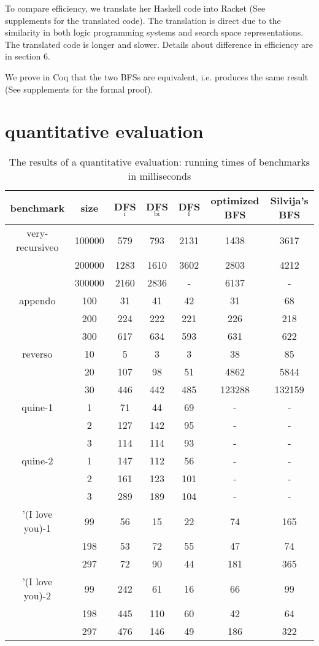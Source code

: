 \documentclass[format=acmlarge, review=true, authordraft=true]{acmart}
\begin{document}
To compare efficiency, we translate her Haskell code into Racket (See 
supplements for the translated code). The translation is direct 
due to the similarity in both logic programming systems and search space 
representations. The translated code is longer and slower. Details about 
difference in efficiency are in section 6.

We prove in Coq that the two BFSs are equivalent, i.e.  
produces the same result (See supplements for the formal proof).

\section{quantitative evaluation}

\begin{table}
	\begin{tabular}{|c|c|c|c|c|c|c|}
		\hline 
		benchmark & size & DFS$_\textrm{i}$ & DFS$_\textrm{bi}$ & DFS$_\textrm{f}$ & optimized BFS & Silvija's BFS  
		\\
		\hline
		very-recursiveo & 100000 &  579 &  793 & 2131 & 1438 & 3617 \\
		& 200000 & 1283 & 1610 & 3602 & 2803 & 4212 \\
		& 300000 & 2160 & 2836 &    - & 6137 &    - \\
		\hline 
		appendo  & 100 &  31 &  41 &  42 &  31 &  68 \\ 
		& 200 & 224 & 222 & 221 & 226 & 218 \\ 
		& 300 & 617 & 634 & 593 & 631 & 622 \\ 
		\hline 
		reverso & 10 &   5 &   3 &   3 &     38 &     85 \\ 
		& 20 & 107 &  98 &  51 &   4862 &   5844 \\
		& 30 & 446 & 442 & 485 & 123288 & 132159 \\ 
		\hline
		quine-1 & 1 &  71 &  44 & 69 & - & - \\ 
		& 2 & 127 & 142 & 95 & - & - \\ 
		& 3 & 114 & 114 & 93 & - & - \\ 
		\hline
		quine-2 & 1 & 147 & 112 &  56 & - & - \\ 
		& 2 & 161 & 123 & 101 & - & - \\ 
		& 3 & 289 & 189 & 104 & - & - \\ 
		\hline 
		'(I love you)-1 &  99 & 56 & 15 & 22 &  74 & 165 \\ 
		& 198 & 53 & 72 & 55 &  47 &  74 \\
		& 297 & 72 & 90 & 44 & 181 & 365 \\ 
		\hline
		'(I love you)-2 &  99 & 242 &  61 & 16 &  66 &  99 \\ 
		& 198 & 445 & 110 & 60 &  42 &  64 \\
		& 297 & 476 & 146 & 49 & 186 & 322 \\ 
		\hline 
	\end{tabular}
	\caption{The results of a quantitative evaluation: running times of 
	benchmarks 
		in milliseconds}
	\label{compare-efficiency}
\end{table}
\end{document}
